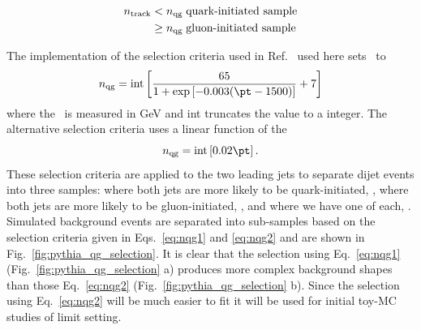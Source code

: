 \begin{align}
n_{\textrm{track}} & < n_{\textrm{qg}} \; \mbox{quark-initiated sample} \label{eq:QGselect} \\
	  & \ge n_{\textrm{qg}} \; \mbox{gluon-initiated sample} \nonumber
\end{align}

The implementation of the selection criteria used in Ref.~\cite{ATL-PHYS-PUB-2017-009} used here sets \nqg\ to 
\begin{equation}
\nqg = \mathrm{int} \left[ \frac{65}{1 + \exp\left[-0.003 (\pt - 1500) \right]} +7 \right]  \label{eq:nqg1} 
\end{equation}
where the \pt\ is measured in GeV and int truncates the value to a integer. The alternative selection criteria uses a linear function of the \pt 
\begin{equation}
\nqg = \mathrm{int} \left[ 0.02 \pt \right].  \label{eq:nqg2} 
\end{equation}
These selection criteria are applied to the two leading jets to separate dijet events into three samples: 
where both jets are more likely to be quark-initiated, \QQ,  where both jets are more likely to 
be gluon-initiated, \GG, and where we have one of each, \QG. 
Simulated background events are separated into sub-samples based on the selection criteria given in 
Eqs.~\ref{eq:nqg1} and \ref{eq:nqg2} and are shown in Fig.~\ref{fig:pythia_qg_selection}. It is clear that
the selection using Eq.~\ref{eq:nqg1} (Fig.~\ref{fig:pythia_qg_selection} a) produces more complex background shapes 
than those Eq.~\ref{eq:nqg2} (Fig.~\ref{fig:pythia_qg_selection} b). Since the selection using  Eq.~\ref{eq:nqg2} will
be much easier to fit it will be used for initial toy-MC studies of limit setting.

